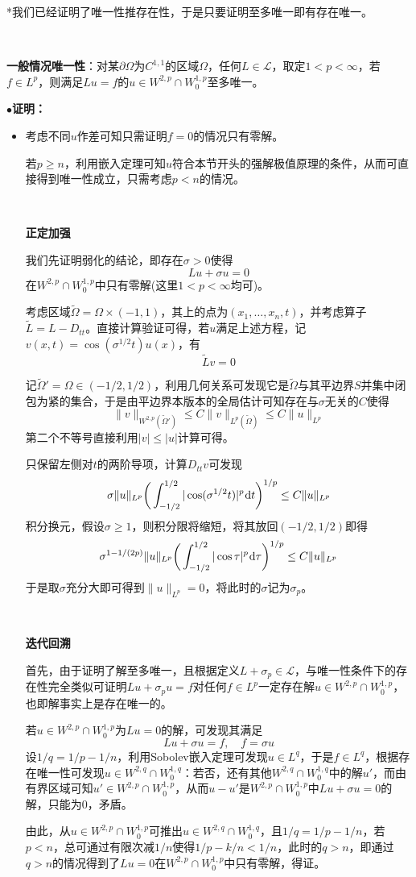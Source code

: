 \documentclass[a4paper,UTF8,fontset=windows,AutoFakeBold]{ctexart}
\newcommand*{\dr}{\hspace{0.07em}\mathrm{d}}
\newcommand{\proo}[1]{{\kaishu $\bullet$\textbf{证明：}
\begin{itemize}
    \item[] #1
\end{itemize}
}}
\begin{document}
*我们已经证明了唯一性推存在性，于是只要证明至多唯一即有存在唯一。

\

\textbf{一般情况唯一性}：对某$\partial\Omega$为$C^{1,1}$的区域$\Omega$，任何$L\in\mathcal{L}$，取定$1<p<\infty$，若$f\in L^p$，则满足$Lu=f$的$u\in W^{2,p}\cap W_0^{1,p}$至多唯一。

\proo{
    考虑不同$u$作差可知只需证明$f=0$的情况只有零解。

    若$p\ge n$，利用嵌入定理可知$u$符合本节开头的强解极值原理的条件，从而可直接得到唯一性成立，只需考虑$p<n$的情况。

    \
    
    \textbf{正定加强}

    我们先证明弱化的结论，即存在$\sigma>0$使得
    $$Lu+\sigma u=0$$
    在$W^{2,p}\cap W_0^{1,p}$中只有零解(这里$1<p<\infty$均可)。

    考虑区域$\tilde{\Omega}=\Omega\times(-1,1)$，其上的点为$(x_1,\dots,x_n,t)$，并考虑算子$\tilde{L}=L-D_{tt}$。直接计算验证可得，若$u$满足上述方程，记$v(x,t)=\cos(\sigma^{1/2}t)u(x)$，有
    $$\tilde{L}v=0$$

    记$\tilde{\Omega}'=\Omega\in(-1/2,1/2)$，利用几何关系可发现它是$\tilde{\Omega}$与其平边界$S$并集中闭包为紧的集合，于是由平边界本版本的全局估计可知存在与$\sigma$无关的$C$使得
    $$\|v\|_{W^{2,p}(\tilde{\Omega}')}\le C\|v\|_{L^p(\tilde{\Omega})}\le C\|u\|_{L^p}$$
    第二个不等号直接利用$|v|\le|u|$计算可得。

    只保留左侧对$t$的两阶导项，计算$D_{tt}v$可发现
    $$\sigma\|u\|_{L^p}\bigg(\int_{-1/2}^{1/2}|\cos(\sigma^{1/2}t)|^p\dr t\bigg)^{1/p}\le C\|u\|_{L^p}$$
    积分换元，假设$\sigma\ge1$，则积分限将缩短，将其放回$(-1/2,1/2)$即得
    $$\sigma^{1-1/(2p)}\|u\|_{L^p}\bigg(\int_{-1/2}^{1/2}|\cos\tau|^p\dr\tau\bigg)^{1/p}\le C\|u\|_{L^p}$$
    于是取$\sigma$充分大即可得到$\|u\|_{L^p}=0$，将此时的$\sigma$记为$\sigma_p$。

    \

    \textbf{迭代回溯}

    首先，由于证明了解至多唯一，且根据定义$L+\sigma_p\in\mathcal{L}$，与唯一性条件下的存在性完全类似可证明$Lu+\sigma_pu=f$对任何$f\in L^p$一定存在解$u\in W^{2,p}\cap W_0^{1,p}$，也即解事实上是存在唯一的。

    若$u\in W^{2,p}\cap W_0^{1,p}$为$Lu=0$的解，可发现其满足
    $$Lu+\sigma u=f,\quad f=\sigma u$$
    设$1/q=1/p-1/n$，利用Sobolev嵌入定理可发现$u\in L^q$，于是$f\in L^q$，根据存在唯一性可发现$u\in W^{2,q}\cap W_0^{1,q}$：若否，还有其他$W^{2,q}\cap W_0^{1,q}$中的解$u'$，而由有界区域可知$u'\in W^{2,p}\cap W_0^{1,p}$，从而$u-u'$是$W^{2,p}\cap W_0^{1,p}$中$Lu+\sigma u=0$的解，只能为0，矛盾。

    由此，从$u\in W^{2,p}\cap W_0^{1,p}$可推出$u\in W^{2,q}\cap W_0^{1,q}$，且$1/q=1/p-1/n$，若$p<n$，总可通过有限次减$1/n$使得$1/p-k/n<1/n$，此时的$q>n$，即通过$q>n$的情况得到了$Lu=0$在$W^{2,p}\cap W_0^{1,p}$中只有零解，得证。
}
\end{document}
